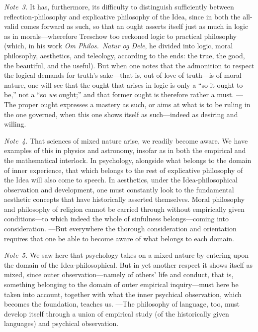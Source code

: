 \documentclass[12pt,a4paper]{book}
\begin{document}
{\small\emph{Note~3.} It has, furthermore, its difficulty to distinguish
sufficiently between reflection-philosophy and explicative philosophy of the Idea,
since in both the all-valid comes forward as such, so that an ought asserts itself
just as much in logic as in morals---wherefore Treschow too reckoned logic to
practical philosophy (which, in his work \textit{Om Philos.\ Natur og Dele}, he
divided into logic, moral philosophy, aesthetics, and teleology, according to the
ends: the true, the good, the beautiful, and the useful). But when one notes that
the admonition to respect the logical demands for truth's sake---that is, out of
love of truth---is of moral nature, one will see that the ought that arises in
logic is only a ``so it ought to be,'' not a ``so \emph{we} ought;'' and that
former ought is therefore rather a must. ---The proper ought expresses a mastery
as such, or aims at what is to be ruling in the one governed, when this one shows
itself as such---indeed as desiring and willing.\par}

{\small\emph{Note~4.} That sciences of mixed nature arise, we readily become aware.
We have examples of this in physics and astronomy, insofar as in both the
empirical and the mathematical interlock. In psychology, alongside what belongs to
the domain of inner experience, that which belongs to the rest of explicative
philosophy of the Idea will also come to speech. In aesthetics, under the
Idea-philosophical observation and development, one must constantly look to the
fundamental aesthetic concepts that have historically asserted themselves. Moral
philosophy and philosophy of religion cannot be carried through without
empirically given conditions---to which indeed the whole of sinfulness
belongs---coming into consideration. ---But everywhere the thorough consideration
and orientation requires that one be able to become aware of what belongs to each
domain.\par}

{\small\emph{Note~5.} We saw here that psychology takes on a mixed nature by
entering upon the domain of the Idea-philosophical. But in yet another respect it
shows itself as mixed, since outer observation---namely of others' life and
conduct, that is, something belonging to the domain of outer empirical
inquiry---must here be taken into account, together with what the inner psychical
observation, which becomes the foundation, teaches us. ---The philosophy of
language, too, must develop itself through a union of empirical study (of the
historically given languages) and psychical observation.\par}
\end{document}
